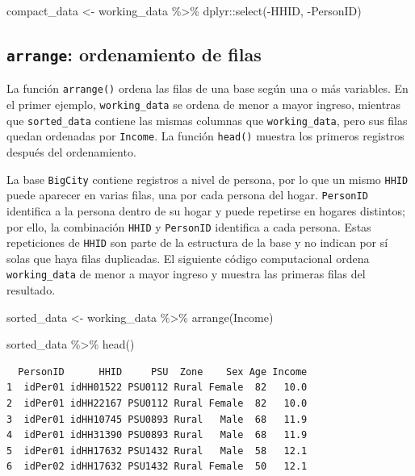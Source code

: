 \documentclass[
  spanish,
  11pt,
  letterpaper,
  oneside,
  open=any]{scrbook}
\newenvironment{Shaded}{\begin{snugshade}}{\end{snugshade}}
\newcommand{\FunctionTok}[1]{\textcolor[rgb]{0.28,0.35,0.67}{#1}}
\newcommand{\NormalTok}[1]{\textcolor[rgb]{0.00,0.23,0.31}{#1}}
\newcommand{\OtherTok}[1]{\textcolor[rgb]{0.00,0.23,0.31}{#1}}
\newcommand{\SpecialCharTok}[1]{\textcolor[rgb]{0.37,0.37,0.37}{#1}}
\begin{document}
\begin{Shaded}
\begin{Highlighting}[]
\NormalTok{compact\_data }\OtherTok{\textless{}{-}}\NormalTok{ working\_data }\SpecialCharTok{\%\textgreater{}\%}
\NormalTok{  dplyr}\SpecialCharTok{::}\FunctionTok{select}\NormalTok{(}\SpecialCharTok{{-}}\NormalTok{HHID, }\SpecialCharTok{{-}}\NormalTok{PersonID)}
\end{Highlighting}
\end{Shaded}

\subsection{\texorpdfstring{\texttt{arrange}: ordenamiento de
filas}{arrange: ordenamiento de filas}}\label{arrange-ordenamiento-de-filas}

La función \texttt{arrange()} ordena las filas de una base según una o
más variables. En el primer ejemplo, \texttt{working\_data} se ordena de
menor a mayor ingreso, mientras que \texttt{sorted\_data} contiene las
mismas columnas que \texttt{working\_data}, pero sus filas quedan
ordenadas por \texttt{Income}. La función \texttt{head()} muestra los
primeros registros después del ordenamiento.

La base \texttt{BigCity} contiene registros a nivel de persona, por lo
que un mismo \texttt{HHID} puede aparecer en varias filas, una por cada
persona del hogar. \texttt{PersonID} identifica a la persona dentro de
su hogar y puede repetirse en hogares distintos; por ello, la
combinación \texttt{HHID} y \texttt{PersonID} identifica a cada persona.
Estas repeticiones de \texttt{HHID} son parte de la estructura de la
base y no indican por sí solas que haya filas duplicadas. El siguiente
código computacional ordena \texttt{working\_data} de menor a mayor
ingreso y muestra las primeras filas del resultado.

\begin{Shaded}
\begin{Highlighting}[]
\NormalTok{sorted\_data }\OtherTok{\textless{}{-}}\NormalTok{ working\_data }\SpecialCharTok{\%\textgreater{}\%}
  \FunctionTok{arrange}\NormalTok{(Income)}

\NormalTok{sorted\_data }\SpecialCharTok{\%\textgreater{}\%}
  \FunctionTok{head}\NormalTok{()}
\end{Highlighting}
\end{Shaded}

\begin{verbatim}
  PersonID      HHID     PSU  Zone    Sex Age Income
1  idPer01 idHH01522 PSU0112 Rural Female  82   10.0
2  idPer01 idHH22167 PSU0112 Rural Female  82   10.0
3  idPer01 idHH10745 PSU0893 Rural   Male  68   11.9
4  idPer01 idHH31390 PSU0893 Rural   Male  68   11.9
5  idPer01 idHH17632 PSU1432 Rural   Male  58   12.1
6  idPer02 idHH17632 PSU1432 Rural Female  50   12.1
\end{verbatim}
\end{document}
